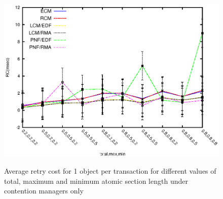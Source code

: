 \documentclass[12pt,english]{report}
\begin{document}
\begin{figure}
{\includegraphics[scale=0.7]
{figures/Abr_dur_20t_21obj_100wr.eps}
\label{fig:pnf_results_1_obj_cm_20t}
}
\caption{Average retry cost for 1 object per transaction for different values of total, maximum and minimum atomic section length under contention managers only}
\label{fig:pnf_results_1_obj_without_lock_free}
\end{figure}
\end{document}
